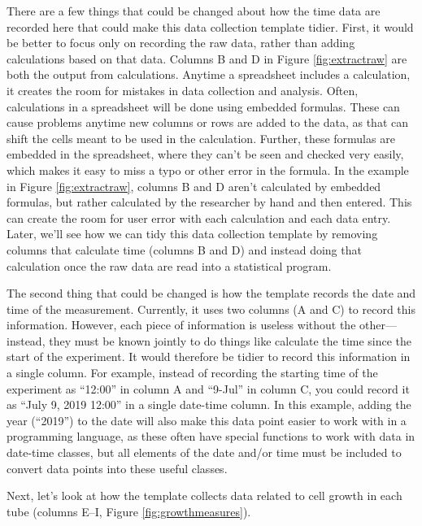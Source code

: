 \documentclass[]{tufte-book}
\begin{document}
There are a few things that could be changed about how the time data are
recorded here that could make this data collection template tidier. First, it
would be better to focus only on recording the raw data, rather than adding
calculations based on that data. Columns B and D in Figure \ref{fig:extractraw}
are both the output from calculations. Anytime a spreadsheet includes a
calculation, it creates the room for mistakes in data collection and analysis.
Often, calculations in a spreadsheet will be done using embedded formulas. These
can cause problems anytime new columns or rows are added to the data, as that
can shift the cells meant to be used in the calculation. Further, these formulas
are embedded in the spreadsheet, where they can't be seen and checked very
easily, which makes it easy to miss a typo or other error in the formula. In the
example in Figure \ref{fig:extractraw}, columns B and D aren't calculated by
embedded formulas, but rather calculated by the researcher by hand and then
entered. This can create the room for user error with each calculation and each
data entry. Later, we'll see how we can tidy this data collection template by
removing columns that calculate time (columns B and D) and instead doing that
calculation once the raw data are read into a statistical program.

The second thing that could be changed is how the template records the date and time
of the measurement. Currently, it uses two columns (A and C) to record this information.
However, each piece of information is useless without the other---instead, they must
be known jointly to do things like calculate the time since the start of the
experiment. It would therefore be tidier to record this information in a single column.
For example, instead of recording the starting time of the experiment as ``12:00'' in
column A and ``9-Jul'' in column C, you could record it as ``July 9, 2019 12:00'' in a
single date-time column. In this example, adding the year (``2019'') to the date will
also make this data point easier to work with in a programming language, as these often
have special functions to work with data in date-time classes, but all elements of the
date and/or time must be included to convert data points into these useful classes.

Next, let's look at how the template collects data related to cell growth in each tube
(columns E--I, Figure \ref{fig:growthmeasures}).
\end{document}
